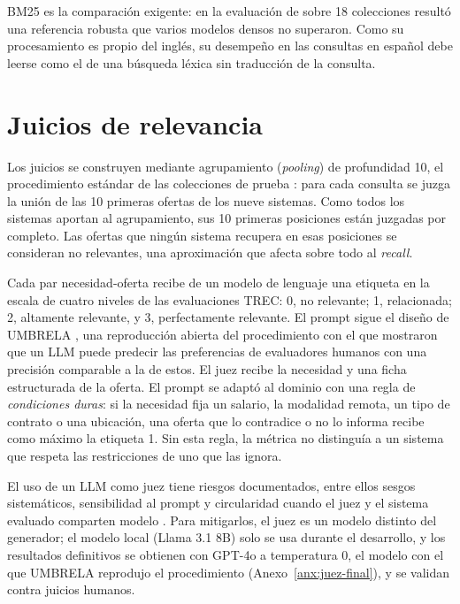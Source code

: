 BM25 es la comparación exigente: en la evaluación de \citet{Thakur2021} sobre 18 colecciones resultó una referencia robusta que varios modelos densos no superaron. Como su procesamiento es propio del inglés, su desempeño en las consultas en español debe leerse como el de una búsqueda léxica sin traducción de la consulta.

\section{Juicios de relevancia}
\label{sec:met-juicios}

Los juicios se construyen mediante agrupamiento (\textit{pooling}) de profundidad 10, el procedimiento estándar de las colecciones de prueba \citep{Sanderson2010}: para cada consulta se juzga la unión de las 10 primeras ofertas de los nueve sistemas. Como todos los sistemas aportan al agrupamiento, sus 10 primeras posiciones están juzgadas por completo. Las ofertas que ningún sistema recupera en esas posiciones se consideran no relevantes, una aproximación que afecta sobre todo al \textit{recall}.

Cada par necesidad-oferta recibe de un modelo de lenguaje una etiqueta en la escala de cuatro niveles de las evaluaciones TREC: 0, no relevante; 1, relacionada; 2, altamente relevante, y 3, perfectamente relevante. El prompt sigue el diseño de UMBRELA \citep{Upadhyay2024}, una reproducción abierta del procedimiento con el que \citet{Thomas2024} mostraron que un LLM puede predecir las preferencias de evaluadores humanos con una precisión comparable a la de estos. El juez recibe la necesidad y una ficha estructurada de la oferta. El prompt se adaptó al dominio con una regla de \emph{condiciones duras}: si la necesidad fija un salario, la modalidad remota, un tipo de contrato o una ubicación, una oferta que lo contradice o no lo informa recibe como máximo la etiqueta 1. Sin esta regla, la métrica no distinguía a un sistema que respeta las restricciones de uno que las ignora.

El uso de un LLM como juez tiene riesgos documentados, entre ellos sesgos sistemáticos, sensibilidad al prompt y circularidad cuando el juez y el sistema evaluado comparten modelo \citep{Faggioli2023,Zheng2023}. Para mitigarlos, el juez es un modelo distinto del generador; el modelo local (Llama 3.1 8B) solo se usa durante el desarrollo, y los resultados definitivos se obtienen con GPT-4o a temperatura 0, el modelo con el que UMBRELA reprodujo el procedimiento (Anexo~\ref{anx:juez-final}), y se validan contra juicios humanos.

